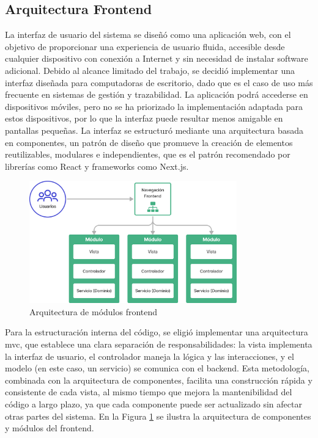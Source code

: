 \subsection{Arquitectura Frontend}

La interfaz de usuario del sistema se diseñó como una aplicación web, con el objetivo de proporcionar una experiencia de usuario fluida, accesible desde cualquier dispositivo con conexión a Internet y sin necesidad de instalar software adicional. Debido al alcance limitado del trabajo, se decidió implementar una interfaz diseñada para computadoras de escritorio, dado que es el caso de uso más frecuente en sistemas de gestión y trazabilidad. La aplicación podrá accederse en dispositivos móviles, pero no se ha priorizado la implementación adaptada para estos dispositivos, por lo que la interfaz puede resultar menos amigable en pantallas pequeñas. La interfaz se estructuró mediante una arquitectura basada en componentes, un patrón de diseño que promueve la creación de elementos reutilizables, modulares e independientes, que es el patrón recomendado por librerías como React y frameworks como Next.js.

\begin{figure}[!b]
\centering
\includegraphics[width=0.8\textwidth]{Figures/frontend-architecture.png}
\caption{Arquitectura de módulos \gls{frontend}}
\label{fig:frontend-architecture}
\end{figure}

Para la estructuración interna del código, se eligió implementar una arquitectura \acrfull{mvc}, que establece una clara separación de responsabilidades: la vista implementa la interfaz de usuario, el controlador maneja la lógica y las interacciones, y el modelo (en este caso, un servicio) se comunica con el \gls{backend}. Esta metodología, combinada con la arquitectura de componentes, facilita una construcción rápida y consistente de cada vista, al mismo tiempo que mejora la mantenibilidad del código a largo plazo, ya que cada componente puede ser actualizado sin afectar otras partes del sistema. En la Figura \ref{fig:frontend-architecture} se ilustra la arquitectura de componentes y módulos del frontend.

